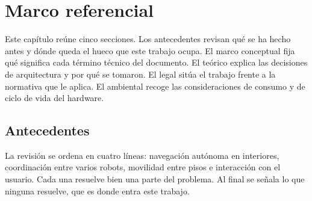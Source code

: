 %
%
\chapter{Marco referencial}

Este capítulo reúne cinco secciones. Los antecedentes revisan qué se ha hecho
antes y dónde queda el hueco que este trabajo ocupa. El marco conceptual fija qué
significa cada término técnico del documento. El teórico explica las decisiones de
arquitectura y por qué se tomaron. El legal sitúa el trabajo frente a la
normativa que le aplica. El ambiental recoge las consideraciones de consumo y de
ciclo de vida del hardware.

\section{Antecedentes}
%

La revisión se ordena en cuatro líneas: navegación autónoma en interiores,
coordinación entre varios robots, movilidad entre pisos e interacción con el
usuario. Cada una resuelve bien una parte del problema. Al final se señala lo
que ninguna resuelve, que es donde entra este trabajo.

